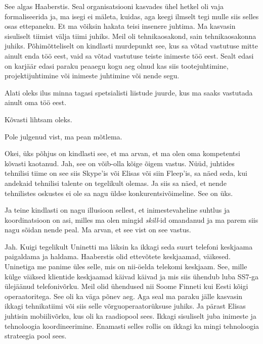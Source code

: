 
See algas Haaberstis. Seal  organisatsiooni kasvades ühel hetkel oli vaja 
formaliseerida ja, ma isegi ei mäleta, kuidas, aga keegi ilmselt tegi mulle 
siis selles osas ettepaneku. Et ma võiksin hakata teisi insenere juhtima. Ma 
kasvasin sisuliselt tiimist välja tiimi juhiks. Meil oli tehnikaosakond, sain 
tehnikaosakonna juhiks. Põhimõtteliselt on kindlasti murdepunkt  see, kus sa 
võtad vastutuse mitte ainult enda töö eest, vaid sa võtad vastutuse teiste 
inimeste töö eest. Sealt edasi on  karjäär edasi paraku peaaegu kogu aeg 
olnud kas siis tootejuhtimine, projektijuhtimine või inimeste juhtimine või 
nende segu. 


Alati oleks ilus minna tagasi spetsialisti liistude juurde, kus ma saaks 
vastutada ainult oma töö eest. 


Kõvasti lihtsam oleks. 


Pole julgenud vist, ma pean mõtlema. 

Okei, üks põhjus on kindlasti see, et ma arvan, et ma olen oma kompetentsi 
kõvasti kaotanud. Jah, see on võib-olla kõige õigem vastus. Nüüd, juhtides 
tehnilisi tiime on see siis Skype'is või Elisas või siin Fleep'is, sa näed 
seda, kui andekaid tehnilisi talente on tegelikult olemas. Ja siis sa näed, et  
nende tehnilistes oskustes ei ole sa nagu üldse konkurentsivõimeline. See on 
üks.


Ja teine kindlasti on nagu illusioon sellest, et  inimestevaheline suhtlus ja 
koordinatsioon on asi, milles ma olen mingid \emph{skill}-id omandanud ja ma 
parem siis nagu sõidan nende peal. Ma arvan, et see vist on see vastus. 


Jah. Kuigi tegelikult Uninetti  ma läksin ka ikkagi seda suurt telefoni 
keskjaama paigaldama ja haldama. Haaberstis olid  ettevõtete keskjaamad, 
väikesed. Uninetiga me panime üles selle, mis on nii-öelda telekomi keskjaam. 
See, mille külge  väiksed klientide keskjaamad käivad käivad ja mis siis 
ühendub luba SS7-ga ülejäänud telefonivõrku. Meil olid ühendused nii Soome 
Finneti  kui Eesti kõigi operaatoritega. See oli ka väga põnev aeg. Aga seal ma 
paraku jälle kasvasin  ikkagi tehnikatiimi või siis selle võrguoperaatorüksuse 
juhiks. Ja pärast Elisas juhtisin mobiilivõrku, kus oli ka raadiopool sees. 
Ikkagi sisuliselt juba inimeste ja tehnoloogia koordineerimine. Enamasti selles 
rollis on ikkagi ka mingi tehnoloogia strateegia pool sees. 

